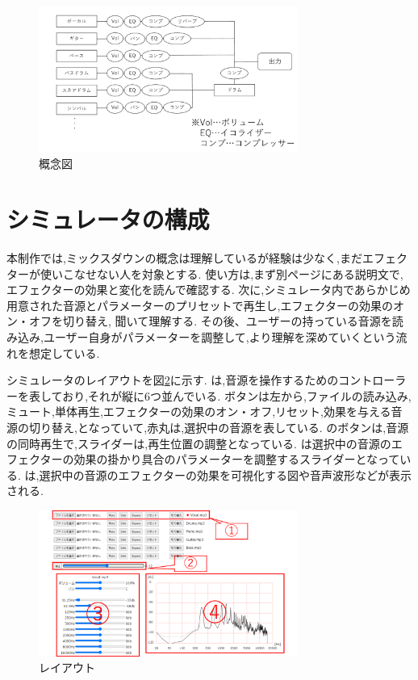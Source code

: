 \documentclass[twocolumn,10pt,a4j]{ltjsarticle}
\begin{document}
\begin{figure}[h]
\centering
 \includegraphics[width=85mm]{./figures/gainen.pdf}
 \caption{概念図}
 \label{fig:gainen}
\end{figure}

\section{シミュレータの構成}
本制作では,ミックスダウンの概念は理解しているが経験は少なく,まだエフェクターが使いこなせない人を対象とする.
使い方は,まず別ページにある説明文で,エフェクターの効果と変化を読んで確認する.
次に,シミュレータ内であらかじめ用意された音源とパラメーターのプリセットで再生し,エフェクターの効果のオン・オフを切り替え, 聞いて理解する.
その後、ユーザーの持っている音源を読み込み,ユーザー自身がパラメーターを調整して,より理解を深めていくという流れを想定している.

シミュレータのレイアウトを図\ref{fig:layout}に示す.
は,音源を操作するためのコントローラーを表しており,それが縦に6つ並んでいる.
ボタンは左から,ファイルの読み込み,ミュート,単体再生,エフェクターの効果のオン・オフ,リセット,効果を与える音源の切り替え,となっていて,赤丸は,選択中の音源を表している.
のボタンは,音源の同時再生で,スライダーは,再生位置の調整となっている.
は選択中の音源のエフェクターの効果の掛かり具合のパラメーターを調整するスライダーとなっている.
は,選択中の音源のエフェクターの効果を可視化する図や音声波形などが表示される.

\begin{figure}[h]
\centering
 \includegraphics[width=85mm]{./figures/layout.pdf}
 \caption{レイアウト}
 \label{fig:layout}
\end{figure}
\end{document}
